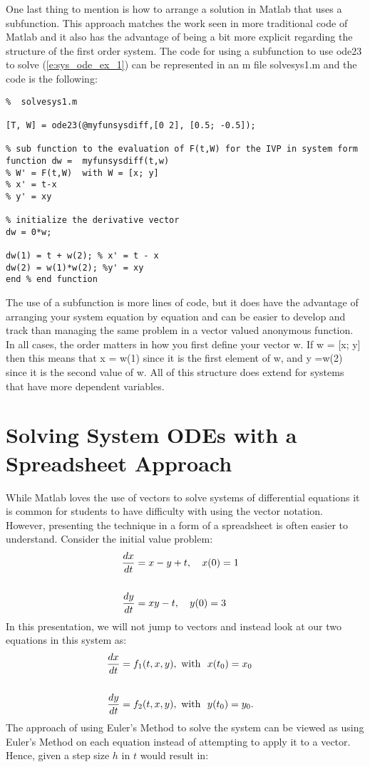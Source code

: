 \documentclass[twoside]{article}
\begin{document}
One last thing to mention is how to arrange a solution in Matlab that uses a subfunction. This approach matches the work seen in more traditional code of Matlab and it also has the advantage of being a bit more explicit regarding the structure of the first order system. The code for using a subfunction to use ode23 to solve (\ref{e:sys_ode_ex_1}) can be represented in an m file solvesys1.m and the code is the following:
\begin{verbatim}
%  solvesys1.m 

[T, W] = ode23(@myfunsysdiff,[0 2], [0.5; -0.5]);

% sub function to the evaluation of F(t,W) for the IVP in system form
function dw =  myfunsysdiff(t,w)
% W' = F(t,W)  with W = [x; y]
% x' = t-x
% y' = xy

% initialize the derivative vector
dw = 0*w;

dw(1) = t + w(2); % x' = t - x
dw(2) = w(1)*w(2); %y' = xy
end % end function 
\end{verbatim}
The use of a subfunction is more lines of code, but it does have the advantage of arranging your system equation by equation and can be easier to develop and track than managing the same problem in a vector valued anonymous function. In all cases, the order matters in how you first define your vector w. If w = [x; y] then this means that x = w(1) since it is the first element of w, and y =w(2) since it is the second value of w. All of this structure does extend for systems that have more dependent variables. 

\section{Solving System ODEs with a Spreadsheet Approach}
While Matlab loves the use of vectors to solve systems of differential equations it is common for students to have difficulty with using the vector notation. However, presenting the technique in a form of a spreadsheet is often easier to understand. Consider the initial value problem:
\begin{eqnarray}
\frac {dx}{dt} &= x-y + t, \ \ \ x(0)=1 \cr \cr 
\frac {dy}{dt} &= xy - t, \ \ \ y(0) = 3
\label{e:euler_sys}
\end{eqnarray}
In this presentation, we will not jump to vectors and instead look at our two equations in this system as:
\begin{eqnarray*}
\frac {dx}{dt} &= f_1(t,x,y), \ {\rm with} \ \  x(t_0) = x_0 \cr \cr
\frac {dy}{dt} &= f_2(t,x,y), \ {\rm with} \ \  y(t_0) = y_0.
\end{eqnarray*}
The approach of using Euler's Method to solve the system can be viewed as using Euler's Method on each equation instead of attempting to apply it to a vector. Hence, given a step size $h$ in $t$ would result in:
\end{document}

